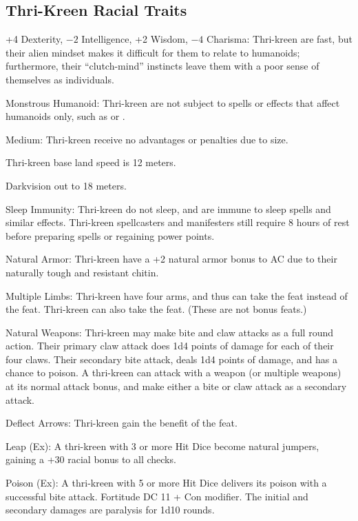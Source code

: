 \subsection{Thri-Kreen Racial Traits}
\begin{itemize*}
    \item +4 Dexterity, $-2$ Intelligence, +2 Wisdom, $-4$ Charisma: Thri-kreen are fast, but their alien mindset makes it difficult for them to relate to humanoids; furthermore, their ``clutch-mind'' instincts leave them with a poor sense of themselves as individuals.
    \item Monstrous Humanoid: Thri-kreen are not subject to spells or effects that affect humanoids only, such as  or .
    \item Medium: Thri-kreen receive no advantages or penalties due to size.
    \item Thri-kreen base land speed is 12 meters.
    \item Darkvision out to 18 meters.
    \item Sleep Immunity: Thri-kreen do not sleep, and are immune to sleep spells and similar effects. Thri-kreen spellcasters and manifesters still require 8 hours of rest before preparing spells or regaining power points.
    \item Natural Armor: Thri-kreen have a +2 natural armor bonus to AC due to their naturally tough and resistant chitin.
    \item Multiple Limbs: Thri-kreen have four arms, and thus can take the  feat instead of the  feat. Thri-kreen can also take the  feat. (These are not bonus feats.)
    \item Natural Weapons: Thri-kreen may make bite and claw attacks as a full round action. Their primary claw attack does 1d4 points of damage for each of their four claws. Their secondary bite attack, deals 1d4 points of damage, and has a chance to poison. A thri-kreen can attack with a weapon (or multiple weapons) at its normal attack bonus, and make either a bite or claw attack as a secondary attack.
    \item Deflect Arrows: Thri-kreen gain the benefit of the  feat.
    \item Leap (Ex): A thri-kreen with 3 or more Hit Dice become natural jumpers, gaining a +30 racial bonus to all  checks.
    \item Poison (Ex): A thri-kreen with 5 or more Hit Dice delivers its poison with a successful bite attack. Fortitude DC 11 + Con modifier. The initial and secondary damages are paralysis for 1d10 rounds.

\end{itemize*}
